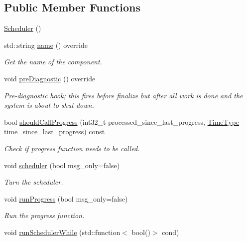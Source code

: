 \subsection*{Public Member Functions}
\begin{DoxyCompactItemize}
\item 
\hyperlink{structvt_1_1sched_1_1_scheduler_a54b61f09996bca1d5ed5332e1a4e2b60}{Scheduler} ()
\item 
std\+::string \hyperlink{structvt_1_1sched_1_1_scheduler_a60d76cb810df35be76d414226c24d6c4}{name} () override
\begin{DoxyCompactList}\small\item\em Get the name of the component. \end{DoxyCompactList}\item 
void \hyperlink{structvt_1_1sched_1_1_scheduler_a42835a58f541dd65cecd4d393fe78a81}{pre\+Diagnostic} () override
\begin{DoxyCompactList}\small\item\em Pre-\/diagnostic hook; this fires before finalize but after all work is done and the system is about to shut down. \end{DoxyCompactList}\item 
bool \hyperlink{structvt_1_1sched_1_1_scheduler_aa1e901f6264aa52d918f4c64802e54b5}{should\+Call\+Progress} (int32\+\_\+t processed\+\_\+since\+\_\+last\+\_\+progress, \hyperlink{namespacevt_a876a9d0cd5a952859c72de8a46881442}{Time\+Type} time\+\_\+since\+\_\+last\+\_\+progress) const
\begin{DoxyCompactList}\small\item\em Check if progress function needs to be called. \end{DoxyCompactList}\item 
void \hyperlink{structvt_1_1sched_1_1_scheduler_ad2653b260780c89a20e9253608ef1282}{scheduler} (bool msg\+\_\+only=false)
\begin{DoxyCompactList}\small\item\em Turn the scheduler. \end{DoxyCompactList}\item 
void \hyperlink{structvt_1_1sched_1_1_scheduler_a9c9fc08f6d205761ad162d391aaa7927}{run\+Progress} (bool msg\+\_\+only=false)
\begin{DoxyCompactList}\small\item\em Run the progress function. \end{DoxyCompactList}\item 
void \hyperlink{structvt_1_1sched_1_1_scheduler_a9c130fc0ccbf237633420a7aa35069a4}{run\+Scheduler\+While} (std\+::function$<$ bool()$>$ cond)

\end{DoxyCompactItemize}
